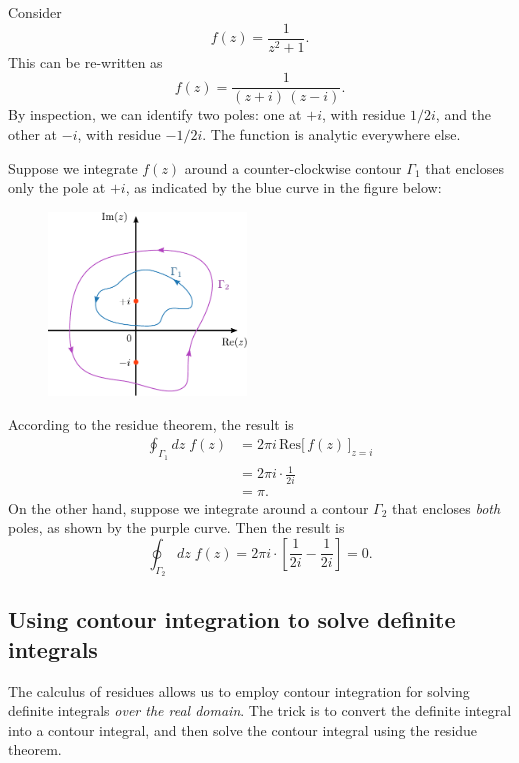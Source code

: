 \documentclass[10pt,a4paper]{article}
\begin{document}
Consider
\begin{equation}
f(z) = \frac{1}{z^2 + 1}.
\end{equation}
This can be re-written as
\begin{equation}
f(z) = \frac{1}{(z + i)\,(z-i)}.
\end{equation}
By inspection, we can identify two poles: one at $+i$, with residue
$1/2i$, and the other at $-i$, with residue $-1/2i$. The function
is analytic everywhere else.

Suppose we integrate $f(z)$ around a counter-clockwise contour
$\Gamma_1$ that encloses only the pole at $+i$, as indicated by the
blue curve in the figure below:

\begin{figure}[ht]
  \centering\includegraphics[width=0.47\textwidth]{contour_example1}
\end{figure}

\noindent
According to the residue theorem, the result is
\begin{align}
  \oint_{\Gamma_1}dz \; f(z) &= 2\pi i\, \mathrm{Res}\big[\,f(z)\,\big]_{z = i} \\
  &= 2\pi i \cdot \frac{1}{2i} \\& = \pi.
\end{align}
On the other hand, suppose we integrate around a contour $\Gamma_2$
that encloses \emph{both} poles, as shown by the purple curve. Then
the result is
\begin{equation}
\oint_{\Gamma_2}dz \; f(z) = 2\pi i \cdot \left[\frac{1}{2i} - \frac{1}{2i}\right] = 0.
\end{equation}

\subsection{Using contour integration to solve definite integrals}
\label{using-contours-to-solve-integrals}

The calculus of residues allows us to employ contour integration for
solving definite integrals \emph{over the real domain}. The trick is
to convert the definite integral into a contour integral, and then
solve the contour integral using the residue theorem.
\end{document}
